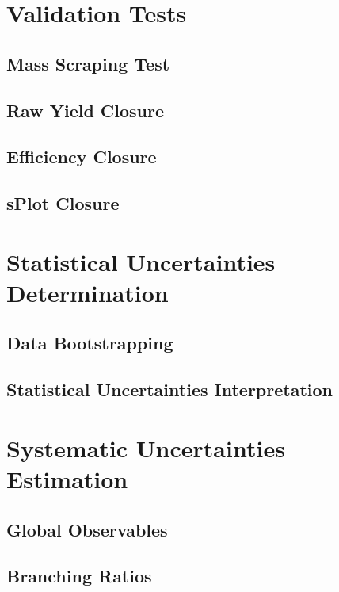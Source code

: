 \section{Validation Tests} 

\subsection{Mass Scraping Test}

\subsection{Raw Yield Closure}

\subsection{Efficiency Closure}

\subsection{sPlot Closure}


\section{Statistical Uncertainties Determination} 

\subsection{Data Bootstrapping}

\subsection{Statistical Uncertainties Interpretation}

\section{Systematic Uncertainties Estimation} 

\subsection{Global Observables}

\subsection{Branching Ratios}

